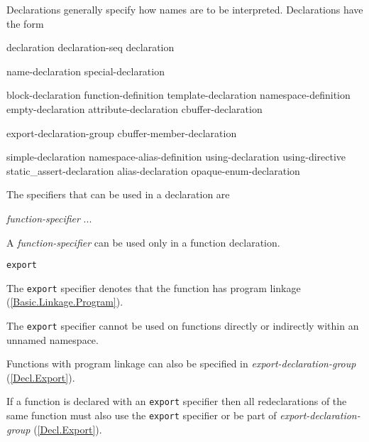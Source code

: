 \p Declarations generally specify how names are to be interpreted. Declarations have the form
\begin{grammar}
  \br
  declaration\br
  declaration-seq declaration\br

  \br
  name-declaration\br
  special-declaration\br

  \br
  block-declaration\br
  function-definition\br
  template-declaration\br
  namespace-definition\br
  empty-declaration\br
  attribute-declaration\br
  cbuffer-declaration\br

  \br
  export-declaration-group\br
  cbuffer-member-declaration\br

  \br
  simple-declaration\br
  namespace-alias-definition\br
  using-declaration\br
  using-directive\br
  static\_assert-declaration\br
  alias-declaration\br
  opaque-enum-declaration\br

  \br
  \terminal{;}

\end{grammar}

\p The specifiers that can be used in a declaration are
\begin{grammar}
  \br
  \textit{function-specifier}\br
  ...
\end{grammar}


\p A \textit{function-specifier} can be used only in a function declaration.

\begin{grammar}
  \br
  \texttt{export}\br
\end{grammar}

\p The \texttt{export} specifier denotes that the function has program linkage (\ref{Basic.Linkage.Program}).

\p The \texttt{export} specifier cannot be used on functions directly or indirectly within an unnamed namespace.

\p Functions with program linkage can also be specified in \textit{export-declaration-group} (\ref{Decl.Export}).

\p If a function is declared with an \texttt{export} specifier then all redeclarations of the same function must also use the \texttt{export} specifier or be part of \textit{export-declaration-group} (\ref{Decl.Export}).

